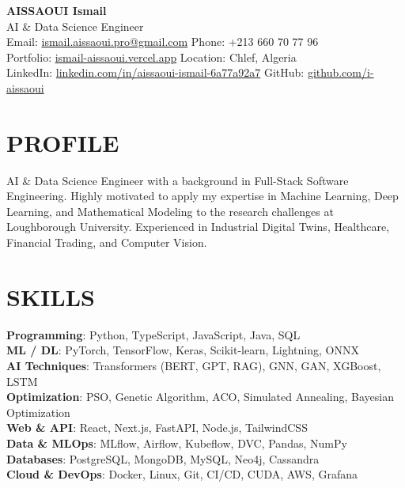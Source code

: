 \documentclass[a4paper,12pt]{article}
\begin{document}
\begin{center}
    {\Huge\bfseries\color{titleblue} AISSAOUI Ismail}\\[4pt]
    {\Large AI \& Data Science Engineer}\\[6pt]

    {\normalsize
    Email: \href{mailto:ismail.aissaoui.pro@gmail.com}{ismail.aissaoui.pro@gmail.com} \quad
    Phone: +213 660 70 77 96 \\
    Portfolio: \href{https://ismail-aissaoui.vercel.app}{ismail-aissaoui.vercel.app} \quad
    Location: Chlef, Algeria \\
    LinkedIn: \href{https://linkedin.com/in/aissaoui-ismail-6a77a92a7}{linkedin.com/in/aissaoui-ismail-6a77a92a7} \quad
    GitHub: \href{https://github.com/i-aissaoui}{github.com/i-aissaoui}
    }
\end{center}

\section{PROFILE}
AI \& Data Science Engineer with a background in Full-Stack Software Engineering. Highly motivated to apply my expertise in Machine Learning, Deep Learning, and Mathematical Modeling to the research challenges at Loughborough University. Experienced in Industrial Digital Twins, Healthcare, Financial Trading, and Computer Vision.

\section{SKILLS}
\textbf{Programming}: Python, TypeScript, JavaScript, Java, SQL \\
\textbf{ML / DL}: PyTorch, TensorFlow, Keras, Scikit-learn, Lightning, ONNX \\
\textbf{AI Techniques}: Transformers (BERT, GPT, RAG), GNN, GAN, XGBoost, LSTM \\
\textbf{Optimization}: PSO, Genetic Algorithm, ACO, Simulated Annealing, Bayesian Optimization \\
\textbf{Web \& API}: React, Next.js, FastAPI, Node.js, TailwindCSS \\
\textbf{Data \& MLOps}: MLflow, Airflow, Kubeflow, DVC, Pandas, NumPy \\
\textbf{Databases}: PostgreSQL, MongoDB, MySQL, Neo4j, Cassandra \\
\textbf{Cloud \& DevOps}: Docker, Linux, Git, CI/CD, CUDA, AWS, Grafana 
\end{document}
